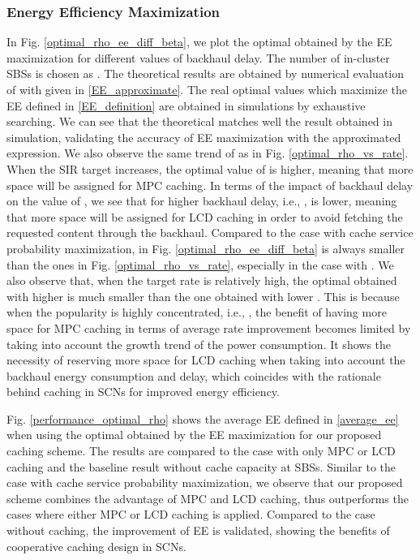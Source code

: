 \documentclass[twocolumns,10pt]{IEEEtran}
\begin{document}
\subsubsection{Energy Efficiency Maximization}
In Fig. \ref{optimal_rho_ee_diff_beta}, we plot the optimal  obtained by the EE maximization for different values of backhaul delay. The number of in-cluster SBSs is chosen as . The theoretical results are obtained by numerical evaluation of  with  given in \eqref{EE_approximate}. The real optimal values which maximize the EE defined in \eqref{EE_definition} are obtained in simulations by exhaustive searching. We can see that the theoretical  matches well the result obtained in simulation, validating the accuracy of EE maximization with the approximated expression. We also observe the same trend of  as in Fig. \ref{optimal_rho_vs_rate}. When the SIR target increases, the optimal value of  is higher, meaning that more space will be assigned for MPC caching. In terms of the impact of backhaul delay on the value of , we see that for higher backhaul delay, i.e., ,  is lower, meaning that more space will be assigned for LCD caching in order to avoid fetching the requested content through the backhaul. Compared to the case with cache service probability maximization,  in Fig. \ref{optimal_rho_ee_diff_beta} is always smaller than the ones in Fig. \ref{optimal_rho_vs_rate}, especially in the case with . We also observe that, when the target rate is relatively high, the optimal  obtained with higher  is much smaller than the one obtained with lower . This is because when the popularity is highly concentrated, i.e., , the benefit of having more space for MPC caching in terms of average rate improvement becomes limited by taking into account the growth trend of the power consumption. It shows the necessity of reserving more space for LCD caching when taking into account the backhaul energy consumption and delay, which coincides with the rationale behind caching in SCNs for improved energy efficiency.



Fig. \ref{performance_optimal_rho} shows the average EE defined in \eqref{average_ee} when using the optimal  obtained by the EE maximization for our proposed caching scheme. The results are compared to the case with only MPC or LCD caching and the baseline result without cache capacity at SBSs. Similar to the case with cache service probability maximization, we observe that our proposed scheme combines the advantage of MPC and LCD caching, thus outperforms the cases where either MPC or LCD caching is applied. Compared to the case without caching, the improvement of EE is validated, showing the benefits of cooperative caching design in SCNs. 
\end{document}
